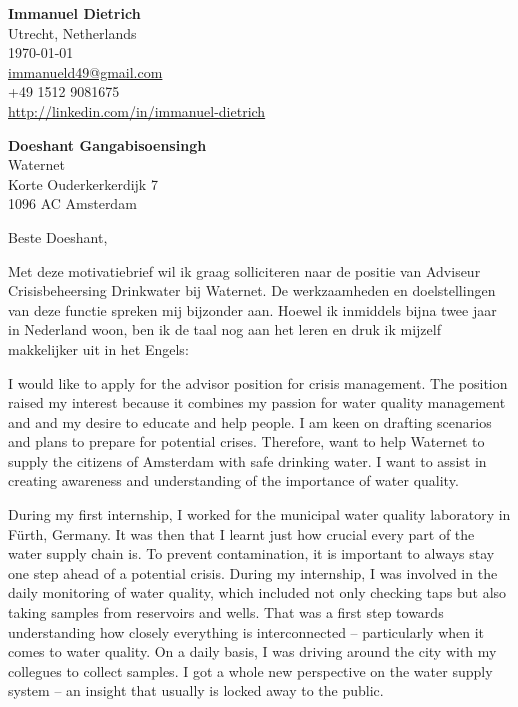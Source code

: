 \documentclass[11pt]{report}
\begin{document}
 
\begin{titlepage}

    \begin{minipage}[t]{0.95\textwidth}
        \hfill
        \raggedleft
        \textbf{Immanuel Dietrich} \\
        Utrecht, Netherlands \\
        \today\\
        \href{mailto:immanueld49@gmail.com}{immanueld49@gmail.com} \\
        +49 1512 9081675 \\
        \url{http://linkedin.com/in/immanuel-dietrich}
    \end{minipage}

\raggedright \textbf{Doeshant Gangabisoensingh} \\ Waternet \\ Korte Ouderkerkerdijk 7 \\  1096 AC Amsterdam \\ 

\vspace{0.7em}

\raggedright Beste Doeshant,\\


\vspace{0.7em}

Met deze motivatiebrief wil ik graag solliciteren naar de positie van Adviseur Crisisbeheersing Drinkwater bij Waternet. De werkzaamheden en doelstellingen van deze functie spreken mij bijzonder aan. 
Hoewel ik inmiddels bijna twee jaar in Nederland woon, ben ik de taal nog aan het leren en druk ik mijzelf makkelijker uit in het Engels:

\vspace{0.7em}

I would like to apply for the advisor position for crisis management. The position raised my interest because it combines my passion for water quality management and and my desire to educate and help people. I am keen on drafting scenarios and plans 
to prepare for potential crises. Therefore, want to help Waternet to supply the citizens of Amsterdam with safe drinking water. I want to assist in creating awareness and understanding of the importance of water quality. 

\vspace{0.7em}

During my first internship, I worked for the municipal water quality laboratory in Fürth, Germany. It was then that I learnt just how crucial every part of the water supply chain is. To prevent contamination, 
it is important to always stay one step ahead of a potential crisis. During my internship, I was involved in the daily monitoring of water quality, which included not only checking taps but also taking samples from reservoirs and wells. 
That was a first step towards understanding how closely everything is interconnected -- particularly when it comes to water quality. On a daily basis, I was driving around the city with my collegues to collect samples. I got a whole new perspective on 
the water supply system -- an insight that usually is locked away to the public.


\end{titlepage}
\end{document}
